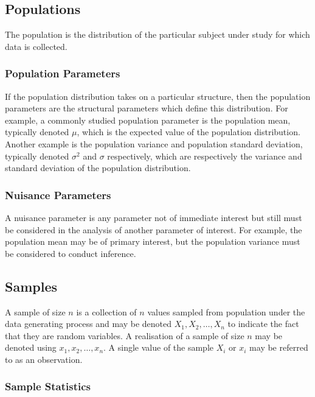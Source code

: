 \documentclass[11pt]{report} %
\begin{document}
\subsection{Populations}

The population is the distribution of the particular subject under study for which data is collected.

\subsubsection{Population Parameters}

If the population distribution takes on a particular structure, then the population parameters are the structural parameters which define this distribution. For example, a commonly studied population parameter is the population mean, typically denoted $\mu$, which is the expected value of the population distribution. Another example is the population variance and population standard deviation, typically denoted $\sigma^{2}$ and $\sigma$ respectively, which are respectively the variance and standard deviation of the population distribution.

\subsubsection{Nuisance Parameters}

A nuisance parameter is any parameter not of immediate interest but still must be considered in the analysis of another parameter of interest. For example, the population mean may be of primary interest, but the population variance must be considered to conduct inference.

\subsection{Samples}

A sample of size $n$ is a collection of $n$ values sampled from population under the data generating process and may be denoted $X_{1}, X_{2}, \dots, X_{n}$ to indicate the fact that they are random variables. A realisation of a sample of size $n$ may be denoted using $x_{1}, x_{2}, \dots, x_{n}$. A single value of the sample $X_{i}$ or $x_{i}$ may be referred to as an observation.

\subsubsection{Sample Statistics}
\end{document}
